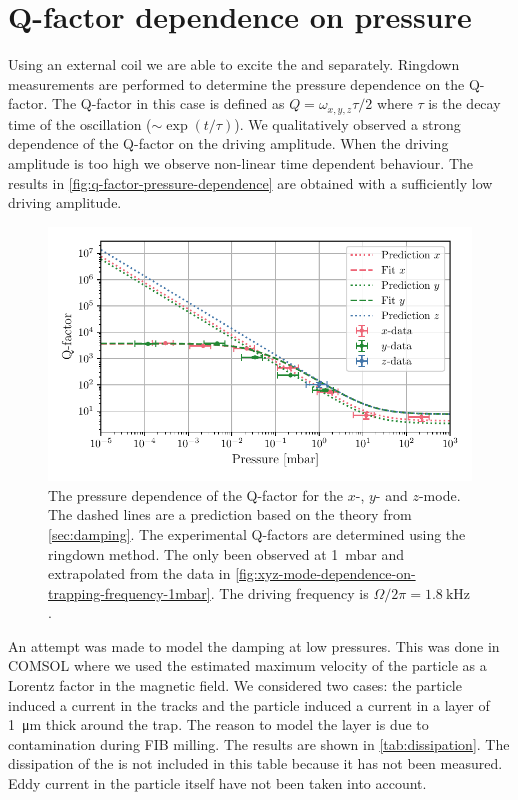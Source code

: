 \section{Q-factor dependence on pressure}
\label{sec:q-factor-dependence-on-pressure}
Using an external coil we are able to excite the \xmode  and \ymode separately. Ringdown measurements are performed to determine the pressure dependence on the Q-factor. The Q-factor in this case is defined as $Q = \omega_{x,y,z} \tau / 2$ where $\tau$ is the decay time of the oscillation ($\sim \exp\left(t / \tau\right)$). We qualitatively observed a strong dependence of the Q-factor on the driving amplitude. When the driving amplitude is too high we observe non-linear time dependent behaviour. The results in \autoref{fig:q-factor-pressure-dependence} are obtained with a sufficiently low driving amplitude.

\begin{figure}[h]
    \centering
    \includegraphics{figures/data/q_factor_pressure_dependence.pdf}
    \caption{The pressure dependence of the Q-factor for the $x$-, $y$- and $z$-mode. The dashed lines are a prediction based on the theory from \autoref{sec:damping}. The experimental Q-factors are determined using the ringdown method. The \zmode only been observed at \qty{1}{\milli\bar} and extrapolated from the data in \autoref{fig:xyz-mode-dependence-on-trapping-frequency-1mbar}. The driving frequency is $\Omega/2\pi = \qty{1.8}{\kilo\hertz}$.}
    \label{fig:q-factor-pressure-dependence}
\end{figure}

An attempt was made to model the damping at low pressures. This was done in COMSOL where we used the estimated maximum velocity of the particle as a Lorentz factor in the magnetic field. We considered two cases: the particle induced a current in the tracks and the particle induced a current in a  layer of \qty{1}{\micro\meter} thick around the trap. The reason to model the  layer is due to contamination during FIB milling. The results are shown in \autoref{tab:dissipation}. The dissipation of the \zmode is not included in this table because it has not been measured. Eddy current in the particle itself have not been taken into account.


